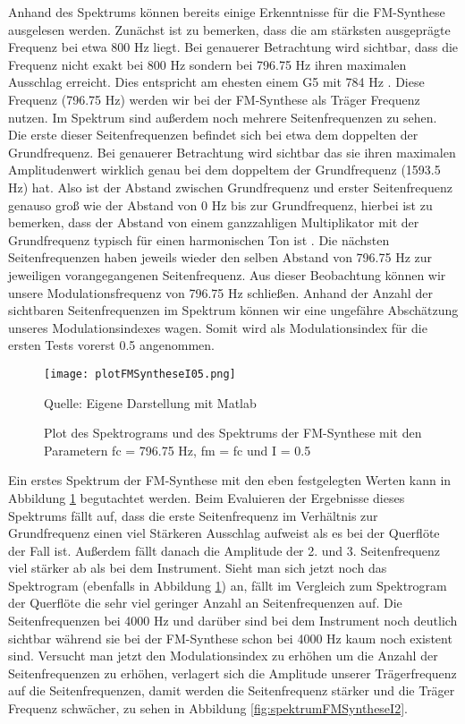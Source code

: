 Anhand des Spektrums können bereits einige Erkenntnisse für die FM-Synthese ausgelesen werden. Zunächst ist zu bemerken, dass die am stärksten ausgeprägte Frequenz bei etwa 800 Hz liegt. Bei genauerer Betrachtung wird sichtbar, dass die Frequenz nicht exakt bei 800 Hz sondern bei 796.75 Hz ihren maximalen Ausschlag erreicht. Dies entspricht am ehesten einem G5 mit 784 Hz \cite[S. 181]{borucki}. Diese Frequenz (796.75 Hz) werden wir bei der FM-Synthese als Träger Frequenz nutzen. Im Spektrum sind außerdem noch mehrere Seitenfrequenzen zu sehen. Die erste dieser Seitenfrequenzen befindet sich bei etwa dem doppelten der Grundfrequenz. Bei genauerer Betrachtung wird sichtbar das sie ihren maximalen Amplitudenwert wirklich genau bei dem doppeltem der Grundfrequenz (1593.5 Hz) hat. Also ist der Abstand zwischen Grundfrequenz und erster Seitenfrequenz genauso groß wie der Abstand von 0 Hz bis zur Grundfrequenz, hierbei ist zu bemerken, dass der Abstand von einem ganzzahligen Multiplikator mit der Grundfrequenz typisch für einen harmonischen Ton ist \cite[S. 528]{chowningPaper}. Die nächsten Seitenfrequenzen haben jeweils wieder den selben Abstand von 796.75 Hz zur jeweiligen vorangegangenen Seitenfrequenz. Aus dieser Beobachtung können wir unsere Modulationsfrequenz von 796.75 Hz schließen. Anhand der Anzahl der sichtbaren Seitenfrequenzen im Spektrum können wir eine ungefähre Abschätzung unseres Modulationsindexes wagen. Somit wird als Modulationsindex für die ersten Tests vorerst 0.5 angenommen. 

\begin{figure} [ht]
\centering
  \texttt{[image: plotFMSyntheseI05.png]}
\caption{Plot des Spektrograms und des Spektrums der FM-Synthese mit den Parametern fc = 796.75 Hz, fm = fc und I = 0.5 }
\label{fig:plotFMSyntheseI05}
Quelle: Eigene Darstellung mit Matlab
\end{figure}

Ein erstes Spektrum der FM-Synthese mit den eben festgelegten Werten kann in Abbildung \ref{fig:plotFMSyntheseI05} begutachtet werden. Beim Evaluieren der Ergebnisse dieses Spektrums fällt auf, dass die erste Seitenfrequenz im Verhältnis zur Grundfrequenz einen viel Stärkeren Ausschlag aufweist als es bei der Querflöte der Fall ist. Außerdem fällt danach die Amplitude der 2. und 3. Seitenfrequenz viel stärker ab als bei dem Instrument. Sieht man sich jetzt noch das Spektrogram (ebenfalls in Abbildung \ref{fig:plotFMSyntheseI05}) an, fällt im Vergleich zum Spektrogram der Querflöte die sehr viel geringer Anzahl an Seitenfrequenzen auf. Die Seitenfrequenzen bei 4000 Hz und darüber sind bei dem Instrument noch deutlich sichtbar während sie bei der FM-Synthese schon bei 4000 Hz kaum noch existent sind. Versucht man jetzt den Modulationsindex zu erhöhen um die Anzahl der Seitenfrequenzen zu erhöhen, verlagert sich die Amplitude unserer Trägerfrequenz auf die Seitenfrequenzen, damit werden die Seitenfrequenz stärker und die Träger Frequenz schwächer, zu sehen in Abbildung \ref{fig:spektrumFMSyntheseI2}. 

